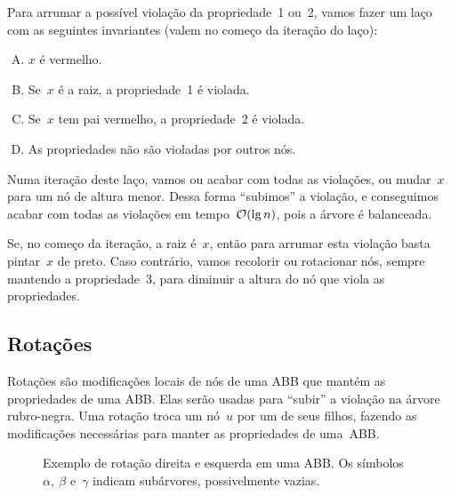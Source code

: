\documentclass[main.tex]{subfiles}
\begin{document}
Para arrumar a possível violação da propriedade~1 ou~2, vamos fazer um laço com as seguintes invariantes (valem no começo da iteração do laço):
\begin{enumerate}[(A)]
\item $x$ é vermelho.
\item Se~$x$ é a raiz, a propriedade~1 é violada.
\item Se~$x$ tem pai vermelho, a propriedade~2 é violada.
\item As propriedades não são violadas por outros nós.
\end{enumerate}

Numa iteração deste laço, vamos ou acabar com todas as violações, ou mudar~$x$ para um nó de altura menor. Dessa forma ``subimos'' a violação, e conseguimos acabar com todas as violações em tempo~$\mathcal{O}(\lg n)$, pois a árvore é balanceada.

Se, no começo da iteração, a raiz é~$x$, então para arrumar esta violação basta pintar~$x$ de preto. Caso contrário, vamos recolorir ou rotacionar nós, sempre mantendo a propriedade~3, para diminuir a altura do nó que viola as propriedades.

\subsection{Rotações}

Rotações são modificações locais de nós de uma ABB que mantém as propriedades de uma ABB. Elas serão usadas para ``subir'' a violação na árvore rubro-negra. Uma rotação troca um nó~$u$ por um de seus filhos, fazendo as modificações necessárias para manter as propriedades de uma~ABB.

\begin{figure}
\centering
{}
\caption{Exemplo de rotação direita e esquerda em uma ABB. Os símbolos~$\alpha,~\beta$ e~$\gamma$ indicam subárvores, possivelmente vazias.} \label{fig:rot_ex}
\end{figure}
\end{document}
